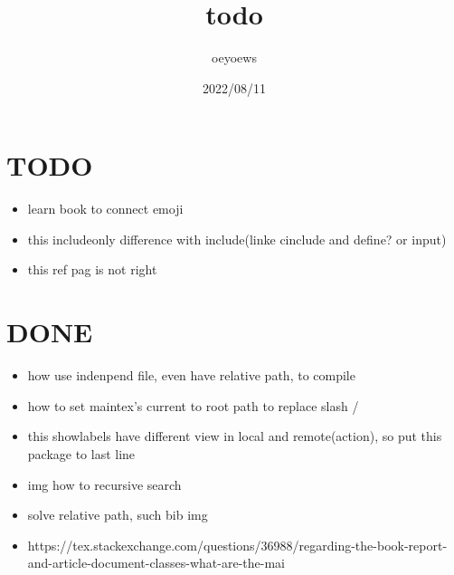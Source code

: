 \documentclass[UTF8]{article}
\title{todo \emoji{check-mark-button}}
\author{oeyoews}
\date{2022/08/11}
\begin{document}
\maketitle

\section{TODO }%
\label{sec:TODO}

\begin{itemize}
  \item learn book to connect emoji
	\item this includeonly difference with include(linke cinclude and define? or
	      input)
	\item this ref pag is not right
\end{itemize}

\section{DONE}%
\label{sec:DONE}

\begin{itemize}
	\item how use indenpend file, even have relative path, to compile
	\item how to set maintex's current to root path to replace slash /
	\item this showlabels have different view in local and remote(action), so put
	      this package to last line
	\item img how to recursive search
	\item solve relative path, such bib img
  \item https://tex.stackexchange.com/questions/36988/regarding-the-book-report-and-article-document-classes-what-are-the-mai
\end{itemize}
\end{document}
